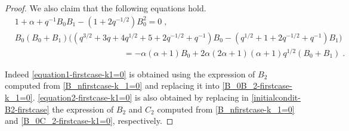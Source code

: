 \documentclass{amsart}
\theoremstyle{remark}
\numberwithin{equation}{section}
\begin{document}
\begin{proof}
We also claim that the following equations hold.
\begin{align}
&1+\alpha +q^{-1}B_0B_1 -(1+2q^{-1/2})B_0^2=0\;,\label{equation1-firstcase-k1=0}\\
&B_0(B_0+B_1)\Big( (q^{3/2}+3q+4q^{1/2}+5+2q^{-1/2}+q^{-1})B_0- (q^{1/2}+1+2q^{-1/2}+q^{-1})B_1 \Big) \label{equation2-firstcase-k1=0} \\
&\quad \quad \quad \quad \quad \quad \quad \quad\quad \quad \quad \quad\quad =-\alpha(\alpha+1)B_0+2\alpha(2\alpha+1)(\alpha+1)q^{1/2}(B_0+B_1)\;.\nonumber
\end{align}

Indeed \eqref{equation1-firstcase-k1=0} is obtained using the expression of $B_2$ computed from \eqref{B_nfirstcase-k_1=0} and replacing it into \eqref{B_0B_2-firstcase-k_1=0}. \eqref{equation2-firstcase-k1=0} is also obtained by replacing in \eqref{initialcondit-B2-firstcase} the expression of $B_2$ and $C_2$ computed from \eqref{B_nfirstcase-k_1=0} and \eqref{B_0C_2-firstcase-k1=0}, respectively. 


\end{proof}
\end{document}
